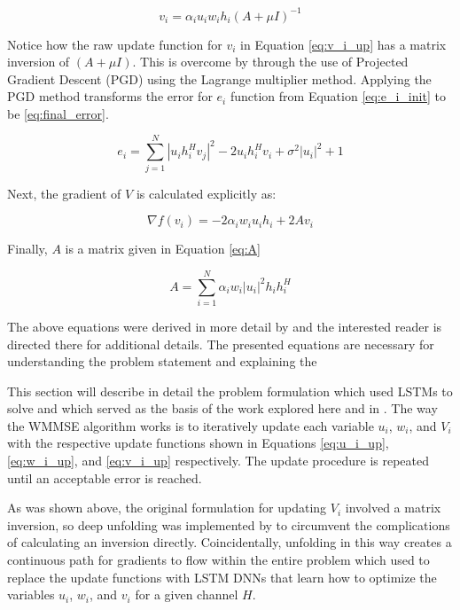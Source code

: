 \documentclass[journal]{IEEEtran}
\begin{document}
\begin{equation}
v_i = \alpha_i u_i w_i h_i(A + \mu I)^{-1}
\label{eq:v_i_up}
\end{equation}

Notice how the raw update function for $v_i$ in Equation \ref{eq:v_i_up} has a matrix inversion of $(A + \mu I)$. This is overcome by \cite{Deep_Unfolding} through the use of Projected Gradient Descent (PGD) using the Lagrange multiplier method. Applying the PGD method transforms the error for $e_i$ function from Equation \ref{eq:e_i_init} to be \ref{eq:final_error}.

\begin{equation}
e_i = \sum^{N}_{j=1}|u_i h_i^H v_j|^2 - 2u_ih_i^Hv_i + \sigma^2|u_i|^2 + 1
\label{eq:final_error}
\end{equation}

Next, the gradient of $V$ is calculated explicitly as:

\begin{equation}
\nabla f(v_i) = -2\alpha_i w_i u_i h_i + 2Av_i
\label{eq:update_V}
\end{equation}

Finally, $A$ is a matrix given in Equation \ref{eq:A}

\begin{equation}
A = \sum^{N}_{i=1}\alpha_i w_i |u_i|^2h_i h^H_i
\label{eq:A}
\end{equation}

The above equations were derived in more detail by \cite{Deep_Unfolding} and the interested reader is directed there for additional details. The presented equations are necessary for understanding the problem statement and explaining the 

This section will describe in detail the problem formulation which \cite{LSTM} used LSTMs to solve and which served as the basis of the work explored here and in \cite{LSTM}. The way the WMMSE algorithm works is to iteratively update each variable $u_i$, $w_i$, and $V_i$ with the respective update functions shown in Equations \ref{eq:u_i_up}, \ref{eq:w_i_up}, and \ref{eq:v_i_up} respectively. The update procedure is repeated until an acceptable error is reached. 

As was shown above, the original formulation for updating $V_i$ involved a matrix inversion, so deep unfolding was implemented by \cite{Deep_Unfolding} to circumvent the complications of calculating an inversion directly. Coincidentally, unfolding in this way creates a continuous path for gradients to flow within the entire problem which \cite{LSTM} used to replace the update functions with LSTM DNNs that learn how to optimize the variables $u_i$, $w_i$, and $v_i$ for a given channel $H$.
\end{document}
